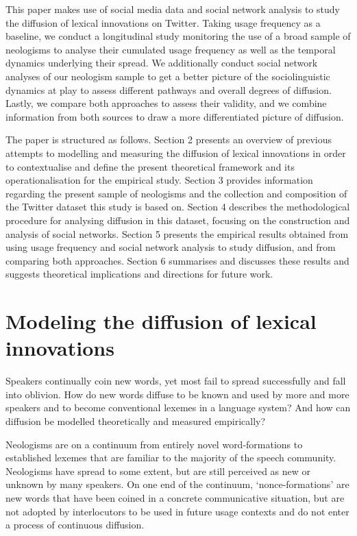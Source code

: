 \documentclass[
  a4paper,
  abstract=on,
  captions=tableabove
  ]{scrartcl}
\begin{document}
This paper makes use of social media data and social network analysis to study the diffusion of lexical innovations on Twitter. Taking usage frequency as a baseline, we conduct a longitudinal study monitoring the use of a broad sample of neologisms to analyse their cumulated usage frequency as well as the temporal dynamics underlying their spread. We additionally conduct social network analyses of our neologism sample to get a better picture of the sociolinguistic dynamics at play to assess different pathways and overall degrees of diffusion. Lastly, we compare both approaches to assess their validity, and we combine information from both sources to draw a more differentiated picture of diffusion.

The paper is structured as follows. Section 2 presents an overview of previous attempts to modelling and measuring the diffusion of lexical innovations in order to contextualise and define the present theoretical framework and its operationalisation for the empirical study. Section 3 provides information regarding the present sample of neologisms and the collection and composition of the Twitter dataset this study is based on. Section 4 describes the methodological procedure for analysing diffusion in this dataset, focusing on the construction and analysis of social networks. Section 5 presents the empirical results obtained from using usage frequency and social network analysis to study diffusion, and from comparing both approaches. Section 6 summarises and discusses these results and suggests theoretical implications and directions for future work.

\section{Modeling the diffusion of lexical innovations}
  \label{sec:modeling-diff}

Speakers continually coin new words, yet most fail to spread successfully and fall into oblivion. How do new words diffuse to be known and used by more and more speakers and to become conventional lexemes in a language system? And how can diffusion be modelled theoretically and measured empirically?

Neologisms are on a continuum from entirely novel word-formations to established lexemes that are familiar to the majority of the speech community. Neologisms have spread to some extent, but are still perceived as new or unknown by many speakers. On one end of the continuum, `nonce-formations' are new words that have been coined in a concrete communicative situation, but are not adopted by interlocutors to be used in future usage contexts and do not enter a process of continuous diffusion.~ \parencite{Hohenhaus1996AdhocWortbildungTerminologie}
\end{document}
